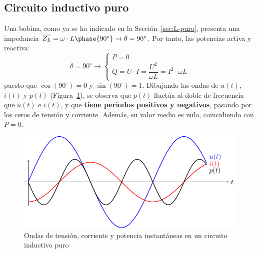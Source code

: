 	\subsection{Circuito inductivo puro}\label{sec.potencia_L}
	Una bobina, como ya se ha indicado en la
        Sección~\ref{sec:L-puro}, presenta una impedancia
        $\overline{Z_L}=\omega\cdot L\phase{90^\circ}\rightarrow
        \theta=90^\circ$. Por tanto, las potencias activa y reactiva:
	\begin{equation}
          \theta = 90^\circ \rightarrow
          \boxed{\begin{cases}
            P = 0\\
            Q = U\cdot I = \dfrac{U^2}{\omega L} = I^2\cdot  \omega L
          \end{cases}}
      \end{equation}
      puesto que $\cos(90^\circ)=0$ y $\sin(90^\circ)=1$. Dibujando
      las ondas de $u(t)$, $i(t)$ y $p(t)$
      (Figura~\ref{fig.inductivoPotencia}), se observa que $p(t)$
      fluctúa al doble de frecuencia que $u(t)$ e $i(t)$, y que
      \textbf{tiene periodos positivos y negativos}, pasando por los
      ceros de tensión y corriente. Además, su valor medio es nulo,
      coincidiendo con $P=0$.
      \begin{figure}[H]
        \centering \includegraphics{../figs/inductivoPuroPotencia.pdf}
        \caption{Ondas de tensión, corriente y potencia instantáneas
          en un circuito inductivo puro}
        \label{fig.inductivoPotencia}
      \end{figure}
	

